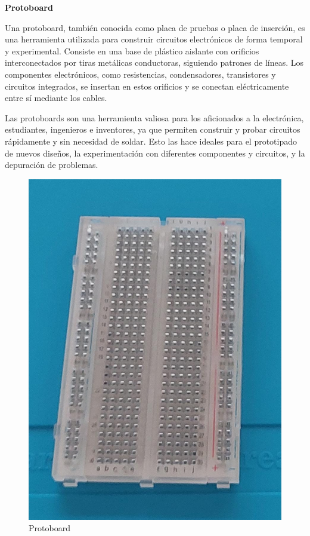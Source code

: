 \textbf{Protoboard}

Una protoboard, también conocida como placa de pruebas o placa de inserción, es una herramienta utilizada para construir circuitos electrónicos de forma temporal y experimental. Consiste en una base de plástico aislante con orificios interconectados por tiras metálicas conductoras, siguiendo patrones de líneas. Los componentes electrónicos, como resistencias, condensadores, transistores y circuitos integrados, se insertan en estos orificios y se conectan eléctricamente entre sí mediante los cables.

Las protoboards son una herramienta valiosa para los aficionados a la electrónica, estudiantes, ingenieros e inventores, ya que permiten construir y probar circuitos rápidamente y sin necesidad de soldar. Esto las hace ideales para el prototipado de nuevos diseños, la experimentación con diferentes componentes y circuitos, y la depuración de problemas. \cite{Protoboard}

\begin{figure}[H]
        \centering
        \includegraphics[trim = {0mm 0mm 0mm 0mm},clip,scale=0.2]{10/Img/protoboard.jpg}
        \caption{Protoboard}
        \label{Protoboard}
    \end{figure}

